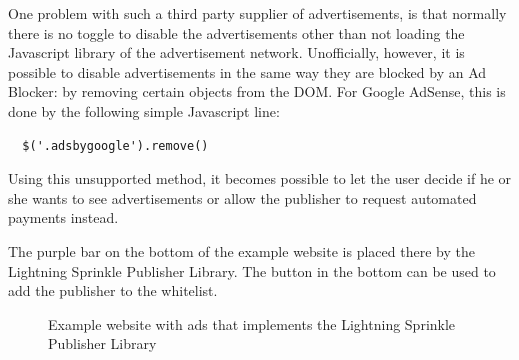 One problem with such a third party supplier of advertisements, is that normally there is no toggle to disable the advertisements other than not loading the Javascript library of the advertisement network. Unofficially, however, it is possible to disable advertisements in the same way they are blocked by an Ad Blocker: by removing certain objects from the DOM. For Google AdSense, this is done by the following simple Javascript line:


\lstset{language=Javascript}
\lstset{frame=lines}
\lstset{basicstyle=\footnotesize}
\begin{lstlisting}
  $('.adsbygoogle').remove()
\end{lstlisting}

Using this unsupported method, it becomes possible to let the user decide if he or she wants to see advertisements or allow the publisher to request automated payments instead.

The purple bar on the bottom of the example website is placed there by the Lightning Sprinkle Publisher Library. The button in the bottom can be used to add the publisher to the whitelist.

\begin{figure}[h!]
  \setlength{\fboxsep}{0pt}%
  \caption{Example website with ads that implements the Lightning Sprinkle Publisher Library}
\end{figure}